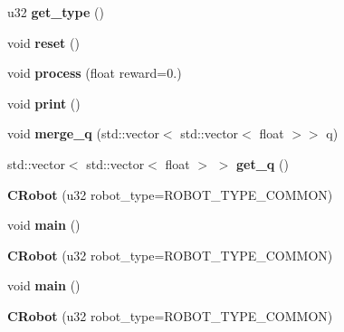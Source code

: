 \begin{DoxyCompactItemize}
\item 
\hypertarget{classCRobot_a5a2be51a9dfc1dcab5de73f087c02690}{u32 {\bfseries get\-\_\-type} ()}\label{classCRobot_a5a2be51a9dfc1dcab5de73f087c02690}

\item 
\hypertarget{classCRobot_aa0aa968c882047df76e98d8fa2f716b5}{void {\bfseries reset} ()}\label{classCRobot_aa0aa968c882047df76e98d8fa2f716b5}

\item 
\hypertarget{classCRobot_a4fa4dc67f0a8c28ed447e5158675aa53}{void {\bfseries process} (float reward=0.)}\label{classCRobot_a4fa4dc67f0a8c28ed447e5158675aa53}

\item 
\hypertarget{classCRobot_a926a6a0a461c1782198792f0e0a2b511}{void {\bfseries print} ()}\label{classCRobot_a926a6a0a461c1782198792f0e0a2b511}

\item 
\hypertarget{classCRobot_a3752dae34a5beeec8eb03ce0e6542763}{void {\bfseries merge\-\_\-q} (std\-::vector$<$ std\-::vector$<$ float $>$$>$ q)}\label{classCRobot_a3752dae34a5beeec8eb03ce0e6542763}

\item 
\hypertarget{classCRobot_a53843dd1d164281804f29596b39631c4}{std\-::vector$<$ std\-::vector$<$ float $>$ $>$ {\bfseries get\-\_\-q} ()}\label{classCRobot_a53843dd1d164281804f29596b39631c4}

\item 
\hypertarget{classCRobot_a0be52a69a658faa46eb952d98a0ecc3d}{{\bfseries C\-Robot} (u32 robot\-\_\-type=R\-O\-B\-O\-T\-\_\-\-T\-Y\-P\-E\-\_\-\-C\-O\-M\-M\-O\-N)}\label{classCRobot_a0be52a69a658faa46eb952d98a0ecc3d}

\item 
\hypertarget{classCRobot_afe0ad435ce2fe954ab7d1eca609d516d}{void {\bfseries main} ()}\label{classCRobot_afe0ad435ce2fe954ab7d1eca609d516d}

\item 
\hypertarget{classCRobot_a0be52a69a658faa46eb952d98a0ecc3d}{{\bfseries C\-Robot} (u32 robot\-\_\-type=R\-O\-B\-O\-T\-\_\-\-T\-Y\-P\-E\-\_\-\-C\-O\-M\-M\-O\-N)}\label{classCRobot_a0be52a69a658faa46eb952d98a0ecc3d}

\item 
\hypertarget{classCRobot_afe0ad435ce2fe954ab7d1eca609d516d}{void {\bfseries main} ()}\label{classCRobot_afe0ad435ce2fe954ab7d1eca609d516d}

\item 
\hypertarget{classCRobot_a0be52a69a658faa46eb952d98a0ecc3d}{{\bfseries C\-Robot} (u32 robot\-\_\-type=R\-O\-B\-O\-T\-\_\-\-T\-Y\-P\-E\-\_\-\-C\-O\-M\-M\-O\-N)}\label{classCRobot_a0be52a69a658faa46eb952d98a0ecc3d}


\end{DoxyCompactItemize}
